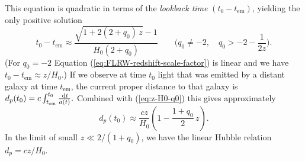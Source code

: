 This equation is quadratic in terms of the \emph{lookback time} \cite[98]{Ryden-2017} $(t_0 - t_{\mathrm{em}})$, yielding the only positive solution
\begin{equation}
	t_0 - t_{\mathrm{em}}
	\approx
	\frac{\sqrt{1 + 2(2+q_0) \, z} - 1}{H_0 (2+q_0)}
	\qquad
	\Big(q_0 \ne -2, \quad q_0 > -2 - \frac{1}{2z} \Big)
	.
\end{equation}
(For $q_0 = -2$ Equation (\ref{eq:FLRW-redshift-scale-factor}) is linear and we have $t_0 - t_{\mathrm{em}} \approx z/H_0$.)
If we observe at time $t_0$ light that was emitted by a distant galaxy at time $t_{\mathrm{em}}$, the current proper distance to that galaxy is
$
	d_p (t_0)
	= c \int_{t_{\mathrm{em}}}^{t_0}\frac{\,\mathrm{d} t}{a(t)}.
$
\cite[105]{Ryden-2017}
Combined with (\ref{eq:z-H0-q0}) this gives approximately
\begin{equation}
	d_p(t_0)
	\approx
	\frac{c z}{H_0} \left( 1 - \frac{1+q_0}{2} \, z \right)
	.
	\label{eq:dp-z-H0-q0}
\end{equation}
In the limit of small $z \ll 2/(1+q_0)$, we have the linear Hubble relation $d_p = cz/ H_0$. \cite[106]{Ryden-2017}




%


